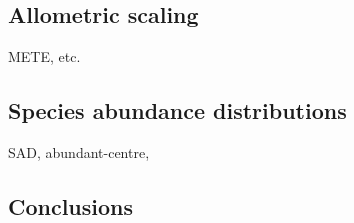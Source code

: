 \documentclass[12pt]{article}
\begin{document}
\bigskip
\subsection*{Allometric scaling}

METE, etc.
















\bigskip
\subsection*{Species abundance distributions}

SAD, abundant-centre, 























\bigskip
\subsection*{Conclusions}
\end{document}
